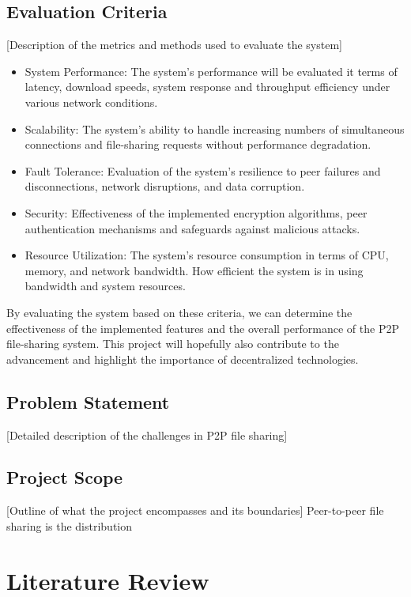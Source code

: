 \documentclass[12pt,a4paper]{report}
\begin{document}
\section{Evaluation Criteria}
 [Description of the metrics and methods used to evaluate the system]

\begin{itemize}
	\item System Performance: The system's performance will be evaluated it terms of latency, download speeds, system response and throughput efficiency under various network conditions.
	\item Scalability: The system's ability to handle increasing numbers of simultaneous connections and file-sharing requests without performance degradation.
	\item Fault Tolerance: Evaluation of the system's resilience to peer failures and disconnections, network disruptions, and data corruption.
	\item Security: Effectiveness of the implemented encryption algorithms, peer authentication mechanisms and safeguards against malicious attacks.
	\item Resource Utilization: The system's resource consumption in terms of CPU, memory, and network bandwidth. How efficient the system is in using bandwidth and system resources.
\end{itemize}

By evaluating the system based on these criteria, we can determine the effectiveness of the implemented features and the overall performance of the P2P file-sharing system.
This project will hopefully also contribute to the advancement and highlight the importance of decentralized technologies.

\section{Problem Statement}
 [Detailed description of the challenges in P2P file sharing]

\section{Project Scope}
 [Outline of what the project encompasses and its boundaries]
Peer-to-peer file sharing is the distribution

\chapter{Literature Review}
\end{document}
